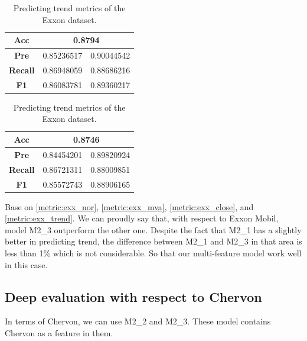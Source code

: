 \begin{table}[H]
	\centering
	\begin{minipage}{0.45\textwidth}
		\centering
		\begin{tabular}{|c|c|c|}
			\hline
			\textbf{Acc}    & \multicolumn{2}{c|}{0.8794} \\
			\hline
			\textbf{Pre}    & 0.85236517                 & 0.90044542 \\
			\hline
			\textbf{Recall} & 0.86948059                 & 0.88686216 \\
			\hline
			\textbf{F1}     & 0.86083781                 & 0.89360217 \\
			\hline
		\end{tabular}
	\end{minipage}
	\begin{minipage}{0.45\textwidth}
		\centering
		\begin{tabular}{|c|c|c|}
			\hline
			\textbf{Acc}    & \multicolumn{2}{c|}{0.8746} \\
			\hline
			\textbf{Pre}    & 0.84454201                 & 0.89820924 \\
			\hline
			\textbf{Recall} & 0.86721311                 & 0.88009851 \\
			\hline
			\textbf{F1}     & 0.85572743                 & 0.88906165 \\
			\hline
		\end{tabular}
	\end{minipage}
	\caption{Predicting trend metrics of the Exxon dataset.}
	\label{metric:exx_trend}
\end{table}

Base on \autoref{metric:exx_nor}, \autoref{metric:exx_mva},
\autoref{metric:exx_close}, and \autoref{metric:exx_trend}. We can proudly say
that, with respect to Exxon Mobil, model M2\_3 outperform the other one. Despite the
fact that M2\_1 has a slightly better in predicting trend, the difference
between M2\_1 and M2\_3 in that area is less than 1\% which is not considerable.
So that our multi-feature model work well in this case.

\subsection{Deep evaluation with respect to Chervon}
In terms of Chervon, we can use M2\_2 and M2\_3. These model contains Chervon as a feature in them.

